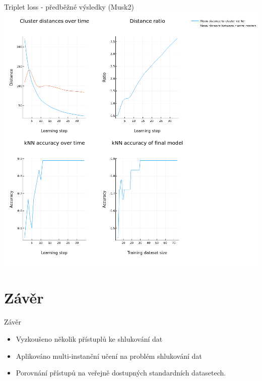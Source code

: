 \documentclass[10pt]{beamer}
\begin{document}
\begin{frame}{Triplet loss - předběžné výsledky (Musk2)}
	\centering
	\includegraphics[width=0.7\pagewidth]{images/triplet.png}
\end{frame}

\section{Závěr}

\begin{frame}{Závěr}
	\begin{itemize}
		\item Vyzkoušeno několik přístuplů ke shlukování dat
		\item Aplikováno multi-instanční učení na problém shlukování dat
		\item Porovnání přístupů na veřejně dostupných standardních datasetech.
	\end{itemize}
\end{frame}
\end{document}
